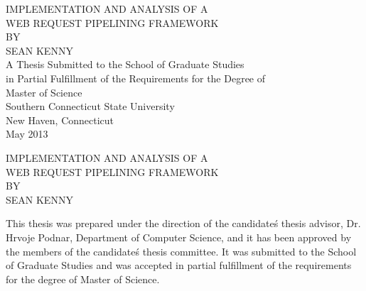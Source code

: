 \documentclass[12pt]{report}
\begin{document}

\newpage
\thispagestyle{empty}
\vspace*{\fill}
\begin{center}
	\large 
	\MakeTextUppercase{Implementation and Analysis of a} \\
	\MakeTextUppercase{Web Request Pipelining Framework} \\ 
	\MakeTextUppercase{By} \\
	\MakeTextUppercase{Sean Kenny} \\
	A Thesis Submitted to the School of Graduate Studies \\
	in Partial Fulfillment of the Requirements for the Degree of \\
	Master of Science \\
	\vspace{.5in}
	Southern Connecticut State University \\
	New Haven, Connecticut \\
	May 2013
\end{center}
\vspace*{\fill}

\newpage
\thispagestyle{plain}
\setcounter{page}{2}
\vspace{2in}
\begin{center}
	\large 
	\MakeTextUppercase{Implementation and Analysis of a} \\
	\MakeTextUppercase{Web Request Pipelining Framework} \\ 
	\MakeTextUppercase{By} \\
	\MakeTextUppercase{Sean Kenny} \\
\end{center}
This thesis was prepared under the direction of the candidate\'s thesis advisor, Dr. Hrvoje Podnar, Department of Computer Science, and it has been approved by the members of the candidate\'s thesis committee. It was submitted to the School of Graduate Studies and was accepted in partial fulfillment of the requirements for the degree of Master of Science.
\end{document}
